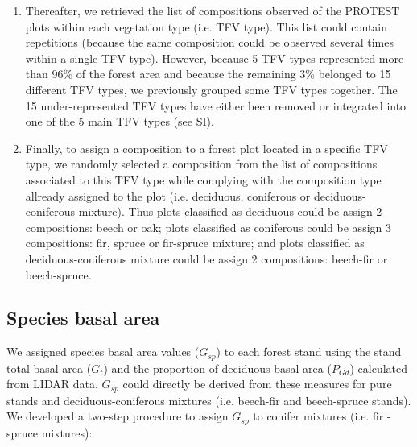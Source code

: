 \documentclass[a4paper]{article}
\begin{document}
\begin{enumerate}
    \item Thereafter, we retrieved the list of compositions observed of the PROTEST plots within each vegetation type (i.e. TFV type). This list could contain repetitions (because the same composition could be observed several times within a single TFV type). However, because 5 TFV types represented more than 96\% of the forest area and because the remaining 3\% belonged to 15 different TFV types, we previously grouped some TFV types together. The 15 under-represented TFV types have either been removed or integrated into one of the 5 main TFV types (see SI).

    \item Finally, to assign a composition to a forest plot located in a specific TFV type, we randomly selected a composition from the list of compositions associated to this TFV type while complying with the composition type allready assigned to the plot (i.e. deciduous, coniferous or deciduous-coniferous mixture). Thus plots classified as deciduous could be assign 2 compositions: beech or oak; plots classified as coniferous could be assign 3 compositions: fir, spruce or fir-spruce mixture; and plots classified as deciduous-coniferous mixture could be assign 2 compositions: beech-fir or beech-spruce.

\end{enumerate}


\subsection*{Species basal area}

\noindent We assigned species basal area values ($G_{sp}$) to each forest stand using the stand total basal area ($G_t$) and the proportion of deciduous basal area ($P_{Gd}$) calculated from LIDAR data. $G_{sp}$ could directly be derived from these measures for pure stands and deciduous-coniferous mixtures (i.e. beech-fir and beech-spruce stands). We developed a two-step procedure to assign $G_{sp}$ to conifer mixtures (i.e. fir - spruce mixtures):
\end{document}
